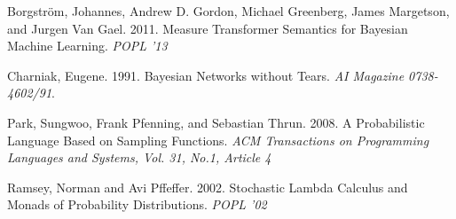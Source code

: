 \documentclass[9pt,twocolumn]{article}
\begin{document}
\begin{thebibliography}{9}

  Borgstr\"om, Johannes, Andrew D. Gordon, Michael Greenberg, James Margetson, and Jurgen Van Gael.
  2011.
  Measure Transformer Semantics for Bayesian Machine Learning.
  \emph{POPL '13}

  Charniak, Eugene.
  1991.
  Bayesian Networks without Tears.
  \emph{AI Magazine 0738-4602/91}.

  Park, Sungwoo, Frank Pfenning, and Sebastian Thrun.
  2008.
  A Probabilistic Language Based on Sampling Functions.
  \emph{ACM Transactions on Programming Languages and Systems, Vol. 31, No.1, Article 4}

  Ramsey, Norman and Avi Pffeffer.
  2002.
  Stochastic Lambda Calculus and Monads of Probability Distributions.
  \emph{POPL '02}

\end{thebibliography}
\end{document}
